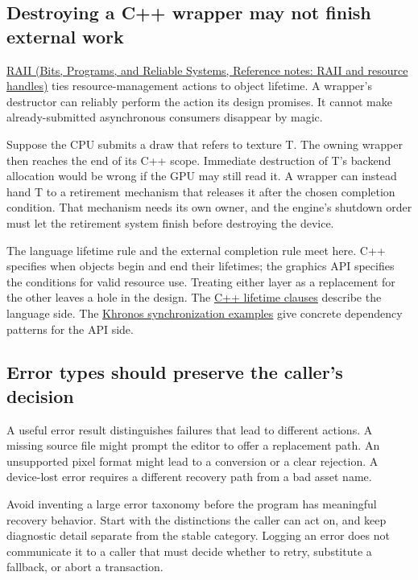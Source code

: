 \subsection{Destroying a C++ wrapper may not finish external work}\label{01-foundations-i-ch008-destroying-a-c-wrapper-may-not-finish-external-work}

\href{../01-Bits-Programs-and-Reliable-Systems/main.pdf\#nameddest=appendix-69739d3ab49b}{RAII (Bits, Programs, and Reliable Systems, Reference notes: RAII and resource handles)} ties resource-management actions to object lifetime. A wrapper's destructor can reliably perform the action its design promises. It cannot make already-submitted asynchronous consumers disappear by magic.

Suppose the CPU submits a draw that refers to texture T. The owning wrapper then reaches the end of its C++ scope. Immediate destruction of T's backend allocation would be wrong if the GPU may still read it. A wrapper can instead hand T to a retirement mechanism that releases it after the chosen completion condition. That mechanism needs its own owner, and the engine's shutdown order must let the retirement system finish before destroying the device.

The language lifetime rule and the external completion rule meet here. C++ specifies when objects begin and end their lifetimes; the graphics API specifies the conditions for valid resource use. Treating either layer as a replacement for the other leaves a hole in the design. The \href{https://eel.is/c++draft/basic.life}{C++ lifetime clauses} describe the language side. The \href{https://docs.vulkan.org/guide/latest/synchronization_examples.html}{Khronos synchronization examples} give concrete dependency patterns for the API side.

\subsection{Error types should preserve the caller's decision}\label{01-foundations-i-ch008-error-types-should-preserve-the-callers-decision}

A useful error result distinguishes failures that lead to different actions. A missing source file might prompt the editor to offer a replacement path. An unsupported pixel format might lead to a conversion or a clear rejection. A device-lost error requires a different recovery path from a bad asset name.

Avoid inventing a large error taxonomy before the program has meaningful recovery behavior. Start with the distinctions the caller can act on, and keep diagnostic detail separate from the stable category. Logging an error does not communicate it to a caller that must decide whether to retry, substitute a fallback, or abort a transaction.

